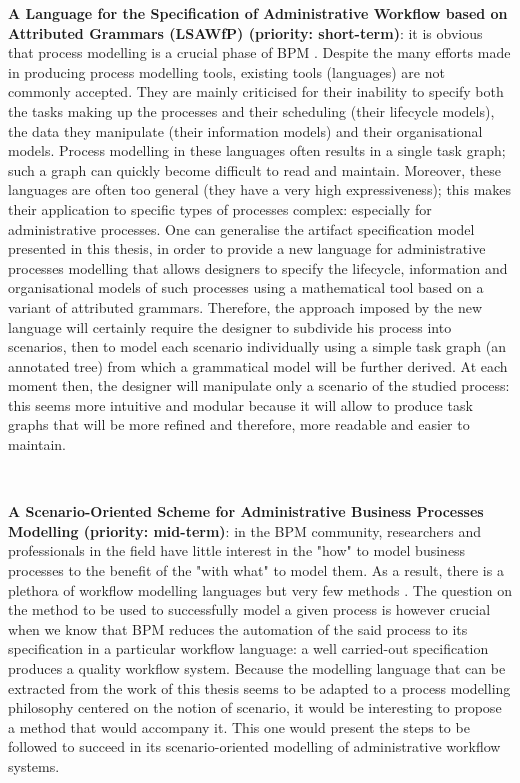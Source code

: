\noindent\textbf{A Language for the Specification of Administrative Workflow based on Attributed Grammars (LSAWfP) (priority: short-term)}: it is obvious that process modelling is a crucial phase of BPM \cite{dumas2018fundamental}. Despite the many efforts made in producing process modelling tools, existing tools (languages) are not commonly accepted. They are mainly criticised for their inability to specify both the tasks making up the processes and their scheduling (their lifecycle models), the data they manipulate (their information models) and their organisational models. Process modelling in these languages often results in a single task graph; such a graph can quickly become difficult to read and maintain. Moreover, these languages are often too general (they have a very high expressiveness); this makes their application to specific types of processes complex: especially for administrative processes. 
One can generalise the artifact specification model presented in this thesis, in order to provide a new language for administrative processes modelling that allows designers to specify the lifecycle, information and organisational models of such processes using a mathematical tool based on a variant of attributed grammars. Therefore, the approach imposed by the new language will certainly require the designer to subdivide his process into scenarios, then to model each scenario individually using a simple task graph (an annotated tree) from which a grammatical model will be further derived. At each moment then, the designer will manipulate only a scenario of the studied process: this seems more intuitive and modular because it will allow to produce task graphs that will be more refined and therefore, more readable and easier to maintain.


~

\noindent\textbf{A Scenario-Oriented Scheme for Administrative Business Processes Modelling (priority: mid-term)}: in the BPM community, researchers and professionals in the field have little interest in the "how" to model business processes to the benefit of the "with what" to model them. As a result, there is a plethora of workflow modelling languages but very few methods \cite{dumas2018fundamental}. The question on the method to be used to successfully model a given process is however crucial when we know that BPM reduces the automation of the said process to its specification in a particular workflow language: a well carried-out specification produces a quality workflow system. Because the modelling language that can be extracted from the work of this thesis seems to be adapted to a process modelling philosophy centered on the notion of scenario, it would be interesting to propose a method that would accompany it. This one would present the steps to be followed to succeed in its scenario-oriented modelling of administrative workflow systems.



